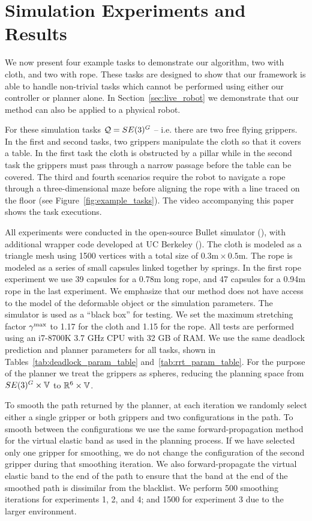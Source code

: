 \section{Simulation Experiments and Results}
\label{sec:simulation_experiments}

We now present four example tasks to demonstrate our algorithm, two with cloth, and two with rope. These tasks are designed to show that our framework is able to handle non-trivial tasks which cannot be performed using either our controller or planner alone. In Section~\ref{sec:live_robot} we demonstrate that our method can also be applied to a physical robot.

For these simulation tasks $\mathcal{Q} = SE(3)^G$ -- i.e. there are two free flying grippers. In the first and second tasks, two grippers manipulate the cloth so that it covers a table. In the first task the cloth is obstructed by a pillar while in the second task the grippers must pass through a narrow passage before the table can be covered. The third and fourth scenarios require the robot to navigate a rope through a three-dimensional maze before aligning the rope with a line traced on the floor (see Figure~\ref{fig:example_tasks}). The video accompanying this paper shows the task executions.


All experiments were conducted in the open-source Bullet simulator (\cite{Coumans2010}), with additional wrapper code developed at UC Berkeley 
(\cite{ucberkley_bullet}). The cloth is modeled as a triangle mesh using 1500 vertices with a total size of $0.3\text{m} \times 0.5\text{m}$. The rope is modeled as a series of small capsules linked together by springs. In the first rope experiment we use 39 capsules for a 0.78m long rope, and 47 capsules for a 0.94m rope in the last experiment. We emphasize that our method does not have access to the model of the deformable object or the simulation parameters. The simulator is used as a ``black box'' for testing. We set the maximum stretching factor $\gamma^{\textrm{max}}$ to 1.17 for the cloth and 1.15 for the rope. All tests are performed using an i7-8700K 3.7 GHz CPU with 32 GB of RAM. We use the same deadlock prediction and planner parameters for all tasks, shown in Tables~\ref{tab:deadlock_param_table} and~\ref{tab:rrt_param_table}. For the purpose of the planner we treat the grippers as spheres, reducing the planning space from $SE(3)^G \times \mathbb{V}$ to $\mathbb{R}^6 \times \mathbb{V}$.

To smooth the path returned by the planner, at each iteration we randomly select either a single gripper or both grippers and two configurations in the path. To smooth between the configurations we use the same forward-propagation method for the virtual elastic band as used in the planning process. If we have selected only one gripper for smoothing, we do not change the configuration of the second gripper during that smoothing iteration. We also forward-propagate the virtual elastic band to the end of the path to ensure that the band at the end of the smoothed path is dissimilar from the blacklist. We perform 500 smoothing iterations for experiments 1, 2, and 4; and 1500 for experiment 3 due to the larger environment.




